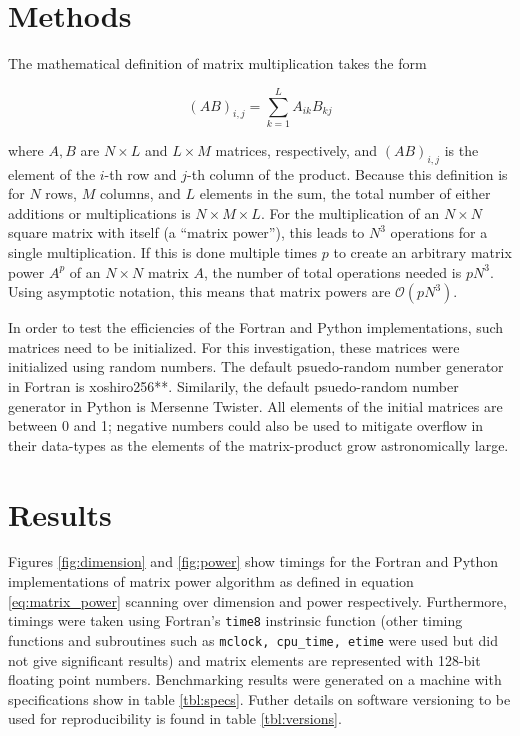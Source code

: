 \documentclass{article}
\begin{document}
\section{Methods}

    The mathematical definition of matrix multiplication takes the form

    \begin{equation} \label{eq:matrix_power}
        (A B)_{i,j} = \sum_{k = 1}^{L} A_{ik} B_{kj}
    \end{equation}

    where $A,B$ are $N \times L$ and $L \times M$ matrices, respectively, and $(A B)_{i,j}$ is the element of the $i$-th row and $j$-th column of the product.  Because this definition is for $N$ rows, $M$ columns, and $L$ elements in the sum, the total number of either additions or multiplications is $N \times M \times L$.  For the multiplication of an $N \times N$ square matrix with itself (a ``matrix power''), this leads to $N^3$ operations for a single multiplication.  If this is done multiple times $p$ to create an arbitrary matrix power $A^p$ of an $N \times N$ matrix $A$, the number of total operations needed is $p N^3$.  Using asymptotic notation, this means that matrix powers are $\mathcal{O}(p N^3)$.

    In order to test the efficiencies of the Fortran and Python implementations, such matrices need to be initialized.  For this investigation, these matrices were initialized using random numbers.  The default psuedo-random number generator in Fortran is xoshiro256**.  Similarily, the default psuedo-random number generator in Python is Mersenne Twister.  All elements of the initial matrices are between 0 and 1; negative numbers could also be used to mitigate overflow in their data-types as the elements of the matrix-product grow astronomically large.

\section{Results}

    Figures \ref{fig:dimension} and \ref{fig:power} show timings for the Fortran and Python implementations of matrix power algorithm as defined in equation \ref{eq:matrix_power} scanning over dimension and power respectively. Furthermore, timings were taken using Fortran's \verb|time8| instrinsic function (other timing functions and subroutines such as \verb|mclock, cpu_time, etime| were used but did not give significant results) and matrix elements are represented with 128-bit floating point numbers.  Benchmarking results were generated on a machine with specifications show in table \ref{tbl:specs}.  Futher details on software versioning to be used for reproducibility is found in table \ref{tbl:versions}.
\end{document}
